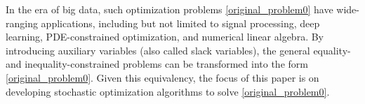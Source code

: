 \documentclass[aos]{imsart}
\numberwithin{equation}{section}
\theoremstyle{plain}
\begin{document}
In the era of big data, such optimization problems \eqref{original_problem0} have wide-ranging applications, including but not limited to signal processing, deep learning, PDE-constrained optimization, and numerical linear algebra.
By introducing auxiliary variables (also called slack variables), the general equality- and inequality-constrained problems can be transformed into the form \eqref{original_problem0}.
Given this equivalency, the focus of this paper is on developing stochastic optimization algorithms to solve \eqref{original_problem0}.
\end{document}
